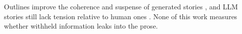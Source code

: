 Outlines improve the coherence and suspense of generated stories \citep{yao2019plan,yang2022re3,yang2023doc,xie2024suspense}, and LLM stories still lack tension relative to human ones \citep{tian2024narratives}.
None of this work measures whether withheld information leaks into the prose.
